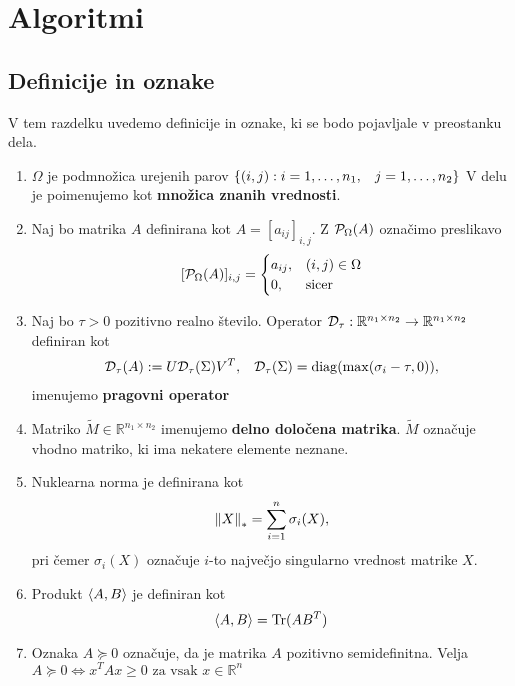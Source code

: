 \chapter{Algoritmi}


\section{Definicije in oznake}
V tem razdelku uvedemo definicije in oznake, ki se bodo pojavljale v preostanku dela.
\begin{enumerate}
  \item $\Omega$ je podmnožica urejenih parov $\{ (i, j) : i = 1, \hdots , n_1, \hspace{0.3cm} j = 1, \hdots, n_2 \}$ V delu je poimenujemo kot \textbf{množica znanih vrednosti}.
  \item Naj bo matrika $A$ definirana kot $A = [a_{ij}]_{i,j}$. Z $\mathcal{P}_\Omega(A)$ označimo preslikavo 
        \[ [\mathcal{P}_\Omega(A)]_{i,j} = \begin{cases}
            a_{ij}, & (i, j) \in \Omega \\
            0,      & \text{sicer}
          \end{cases}
        \]
  \item Naj bo $\tau > 0$ pozitivno realno število. Operator $\mathcal{D}_\tau: \mathbb{R}^{n_1 \times n_2} \rightarrow \mathbb{R}^{n_1 \times n_2}$ definiran kot
        \begin{align}
          \label{1007-1959}
          \mathcal{D}_\tau(A) := U \mathcal{D}_\tau(\Sigma) V^T, \hspace{0.3cm} \mathcal{D}_\tau(\Sigma) = \operatorname{diag}(\max(\sigma_i - \tau, 0)),
        \end{align}
        imenujemo \textbf{pragovni operator} \cite{CCS}
  \item Matriko $\tilde{M} \in \mathbb{R}^{n_1 \times n_2}$ imenujemo \textbf{delno določena matrika}. $\tilde{M}$ označuje vhodno matriko, ki ima nekatere elemente neznane.
  \item Nuklearna norma je definirana kot \[
          \left\lVert X\right\rVert_* = \sum_{i = 1}^{n} \sigma_i(X),
        \] pri čemer $\sigma_i(X)$ označuje $i$-to največjo singularno vrednost matrike $X$.
  \item Produkt $\langle A, B \rangle$ je definiran kot \[
          \langle A, B \rangle = \text{Tr}(AB^T)
        \]
  \item Oznaka $A \succeq 0$ označuje, da je matrika $A$ pozitivno semidefinitna. Velja $A \succeq 0 \iff x^TAx \ge 0 \text{ za vsak } x \in \mathbb{R}^n$

\end{enumerate}






